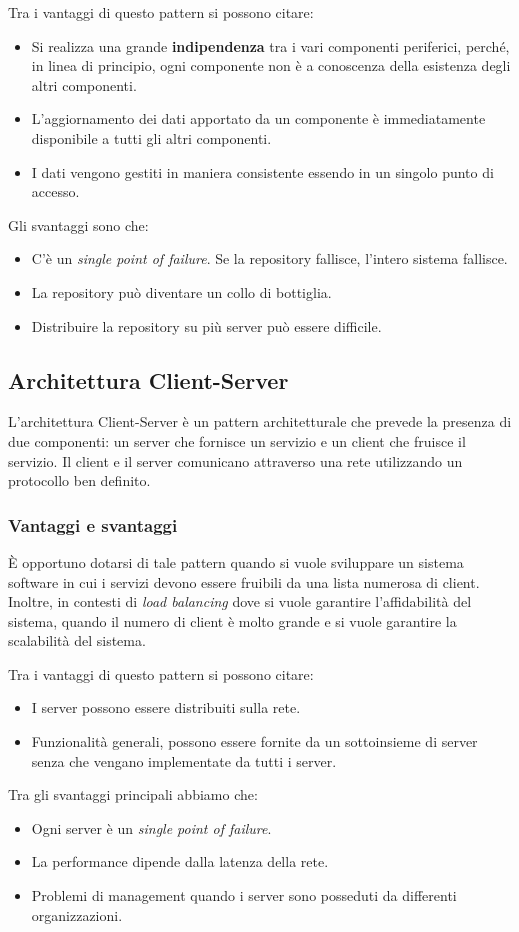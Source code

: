 Tra i vantaggi di questo pattern si possono citare:
\begin{itemize}
    \item Si realizza una grande \textbf{indipendenza} tra i vari componenti periferici,
    perché, in linea di principio, ogni componente non è a conoscenza della 
    esistenza degli altri componenti.
    \item L'aggiornamento dei dati apportato da un componente è immediatamente
    disponibile a tutti gli altri componenti.
    \item I dati vengono gestiti in maniera consistente essendo in un singolo 
    punto di accesso.
\end{itemize}
Gli svantaggi sono che:
\begin{itemize}
    \item C'è un \textit{single point of failure}. Se la repository fallisce,
    l'intero sistema fallisce.
    \item La repository può diventare un collo di bottiglia.
    \item Distribuire la repository su più server può essere difficile.
\end{itemize}
\subsection{Architettura Client-Server}
L'architettura Client-Server è un pattern architetturale che prevede la presenza
di due componenti: un server che fornisce un servizio e un client che fruisce
il servizio. Il client e il server comunicano attraverso una rete utilizzando
un protocollo ben definito.

\subsubsection{Vantaggi e svantaggi}
È opportuno dotarsi di tale pattern quando si vuole sviluppare un sistema software
in cui i servizi devono essere fruibili da una lista numerosa di client. Inoltre,
in contesti di \textit{load balancing} dove si vuole garantire l'affidabilità del
sistema, quando il numero di client è molto grande e si vuole garantire la
scalabilità del sistema.

Tra i vantaggi di questo pattern si possono citare:
\begin{itemize}
    \item I server possono essere distribuiti sulla rete.
    \item Funzionalità generali, possono essere fornite da un sottoinsieme di server senza che 
    vengano implementate da tutti i server.
\end{itemize}
Tra gli svantaggi principali abbiamo che:
\begin{itemize}
    \item Ogni server è un \textit{single point of failure}.
    \item La performance dipende dalla latenza della rete.
    \item Problemi di management quando i server sono posseduti da differenti 
    organizzazioni.
\end{itemize}

